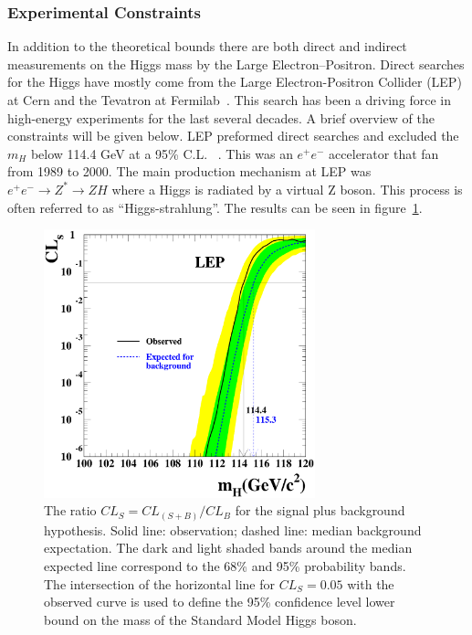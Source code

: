 \subsubsection{Experimental Constraints}

In addition to the theoretical bounds there are both direct and indirect measurements on the Higgs mass by the Large Electron–Positron.  Direct searches for the Higgs have mostly come from the Large Electron-Positron Collider (LEP) at Cern and the Tevatron at Fermilab~\cite{ALEPH:2010aa}. This search has been a driving force in high-energy experiments for the last several decades.  A brief overview of the constraints will be given below.
 LEP preformed direct searches and excluded the $m_H$ below 114.4 GeV at a 95\% C.L. ~\cite{Barate:2003sz}. This was an $e^+e^-$ accelerator that fan from 1989 to 2000. The main production mechanism at LEP was $e^+e^- \rightarrow Z^* \rightarrow ZH$ where a Higgs is radiated by a virtual Z boson.  This process is often referred to as ``Higgs-strahlung''.  The results can be seen in figure~\ref{fig:adlocls}.

\begin{figure}[htb]
\centering
\includegraphics[width=0.7\textwidth]{StandardModel/fig9.eps}
\caption{\small The ratio $CL_S=CL_{(S+B)}/CL_B$
 for the signal plus background hypothesis. Solid line: observation; dashed line:
median background expectation. The dark and light shaded bands around the median
expected line correspond to the 68\% and 95\% probability bands. The intersection of the horizontal line 
for 
$CL_S = 0.05$
 with the observed curve is used to define the 95\%
confidence level
lower bound on the mass of the Standard Model Higgs boson.~\cite{Barate:2003sz} }
\label{fig:adlocls}
\end{figure}

